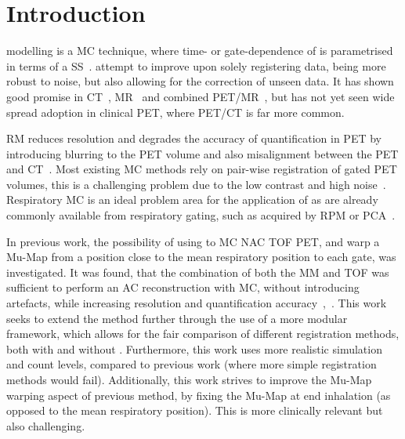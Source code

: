 
\section{Introduction} \label{sec:introduction}
     modelling is a \gls{MC} technique, where time- or gate-dependence of  is parametrised in terms of a \gls{SS}~\cite{McClelland2013}.  attempt to improve upon solely registering data, being more robust to noise, but also allowing for the correction of unseen data. It has shown good promise in \gls{CT}~\cite{Li2007EnhancedModel}, \gls{MR}~\cite{Manke2002RespiratoryModels}
    and  combined \gls{PET}/\gls{MR}~\cite{Manber2016JointCorrection.}, but has not yet seen wide spread adoption in clinical \gls{PET}, where \gls{PET}/\gls{CT} is far more common.
    
    \gls{RM} reduces resolution and degrades the accuracy of quantification in \gls{PET} by introducing blurring to the \gls{PET} volume and also misalignment between the \gls{PET} and \gls{CT}~\cite{Nehmeh2008a}. Most existing \gls{MC} methods rely on pair-wise registration of gated \gls{PET} volumes, this is a challenging problem due to the low contrast and high noise~\cite{Oliveira2014}. Respiratory \gls{MC} is an ideal problem area for the application of  as  are already commonly available from respiratory gating, such as acquired by \gls{RPM} or \gls{PCA}~\cite{Thielemans2011}.
    
    In previous work, the possibility of using  to \gls{MC} \gls{NAC} \gls{TOF} \gls{PET}, and warp a \gls{Mu-Map} from a position close to the mean respiratory position to each gate, was investigated. It was found, that the combination of both the \gls{MM} and \gls{TOF} was sufficient to perform an \gls{AC} reconstruction with \gls{MC}, without introducing artefacts, while increasing resolution and quantification accuracy~\cite{Whitehead2019ImpactPET},~\cite{Whitehead2020PET/CTFields}. This work seeks to extend the method further through the use of a more modular framework, which allows for the fair comparison of different registration methods, both with and without . Furthermore, this work uses more realistic simulation and count levels, compared to previous work (where more simple registration methods would fail). Additionally, this work strives to improve the \gls{Mu-Map} warping aspect of previous method, by fixing the \gls{Mu-Map} at end inhalation (as opposed to the mean respiratory position). This is more clinically relevant but also challenging.
    
